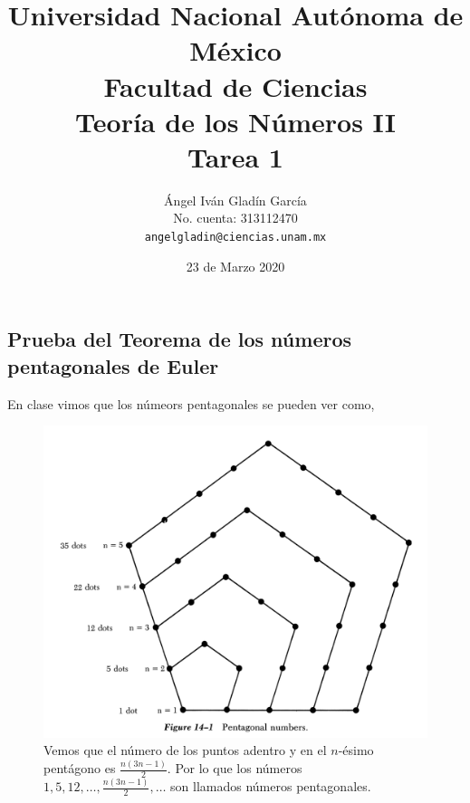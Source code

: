 \documentclass[12pt,letterpaper]{article}
\begin{document}
\title{
        Universidad Nacional Autónoma de México\\
        Facultad de Ciencias\\
        Teoría de los Números II\\
    \vspace{.5cm}
    \large
        \textbf{Tarea 1}
}
\author{
    Ángel Iván Gladín García\\
    No. cuenta: 313112470\\
    \texttt{angelgladin@ciencias.unam.mx}
}
\date{23 de Marzo 2020}
\maketitle

\newtheorem{theorem}{Teorema}
\newtheorem{example}{Ejemplo}
\newtheorem{corollary}{Corolario}
\newtheorem{lemma}{Lemma}
\newtheorem{definition}{Definicion}
\newtheorem{prop}{Proposicion}

\subsection*{Prueba del Teorema de los números pentagonales de Euler}

En clase vimos que los númeors pentagonales se pueden ver como,

\begin{figure}[H]
    \centering
    \includegraphics[scale=0.3]{assests/1.png}
    \caption{Vemos que el número de los puntos adentro y en el $n$-ésimo pentágono es
    $\frac{n(3n-1)}{2}$. Por lo que los números $1,5,12,\ldots,\frac{n(3n-1)}{2},\ldots$ son
    llamados números pentagonales.}
\end{figure}
\end{document}
